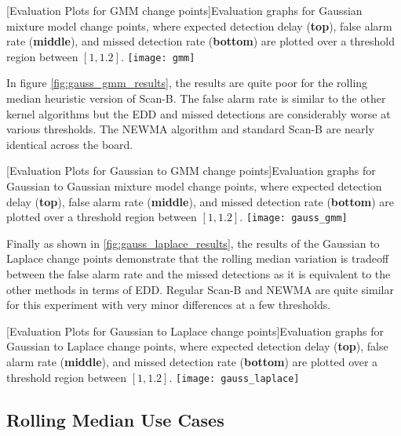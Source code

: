 \begin{center} 
[Evaluation Plots for GMM change points]{Evaluation graphs for Gaussian mixture model change points, where expected detection delay (\textbf{top}), false alarm rate (\textbf{middle}), and missed detection rate (\textbf{bottom}) are plotted over a threshold region between $[1,1.2]$. } 
\texttt{[image: gmm]} 
\label{fig:gmm_results} 
\end{center}

In figure \ref{fig:gauss_gmm_results}, the results are quite poor for the rolling median heuristic version of Scan-B. The false alarm rate is similar to the other kernel algorithms but the EDD and missed detections are considerably worse at various thresholds. The NEWMA algorithm and standard Scan-B are nearly identical across the board.
\begin{center} 
[Evaluation Plots for Gaussian to GMM change points]{Evaluation graphs for Gaussian to Gaussian mixture model change points, where expected detection delay (\textbf{top}), false alarm rate (\textbf{middle}), and missed detection rate (\textbf{bottom}) are plotted over a threshold region between $[1,1.2]$. } 
\texttt{[image: gauss\_gmm]} 
\label{fig:gauss_gmm_results} 
\end{center}

Finally as shown in \ref{fig:gauss_laplace_results}, the results of the Gaussian to Laplace change points demonstrate that the rolling median variation is tradeoff between the false alarm rate and the missed detections as it is equivalent to the other methods in terms of EDD. Regular Scan-B and NEWMA are quite similar for this experiment with very minor differences at a few thresholds. 
\begin{center} 
[Evaluation Plots for Gaussian to Laplace change points]{Evaluation graphs for Gaussian to Laplace change points, where expected detection delay (\textbf{top}), false alarm rate (\textbf{middle}), and missed detection rate (\textbf{bottom}) are plotted over a threshold region between $[1,1.2]$. } 
\texttt{[image: gauss\_laplace]} 
\label{fig:gauss_laplace_results} 
\end{center}

\subsection{Rolling Median Use Cases}

